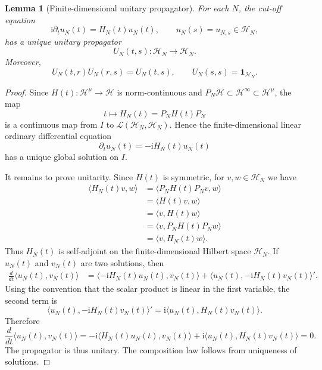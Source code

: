 \documentclass[11pt]{amsart}
\theoremstyle{plain}
\newtheorem{lemma}[theorem]{Lemma}
\theoremstyle{definition}
\theoremstyle{remark}
\newcommand{\Hilb}{\mathcal H}
\newcommand{\Id}{\mathbf 1}
\newcommand{\ii}{\mathrm i}
\begin{document}
\begin{lemma}[Finite-dimensional unitary propagator]
\label{lem:finite-propagator}
For each \(N\), the cut-off equation
\[
        \ii\partial_t u_N(t)=H_N(t)u_N(t),
        \qquad
        u_N(s)=u_{N,s}\in\Hilb_N,
\]
has a unique unitary propagator
\[
        U_N(t,s):\Hilb_N\to\Hilb_N.
\]
Moreover,
\[
        U_N(t,r)U_N(r,s)=U_N(t,s),
        \qquad
        U_N(s,s)=\Id_{\Hilb_N}.
\]
\end{lemma}

\begin{proof}
Since \(H(t):\Hilb^\mu\to\Hilb\) is norm-continuous and
\(P_N\Hilb\subset \Hilb^\infty\subset \Hilb^\mu\), the map
\[
        t\longmapsto H_N(t)=P_NH(t)P_N
\]
is a continuous map from \(I\) to
\(\mathcal L(\Hilb_N,\Hilb_N)\).  Hence the finite-dimensional linear
ordinary differential equation
\[
        \partial_t u_N(t)=-\ii H_N(t)u_N(t)
\]
has a unique global solution on \(I\).

It remains to prove unitarity.  Since \(H(t)\) is symmetric, for
\(v,w\in\Hilb_N\) we have
\[
\begin{aligned}
        \langle H_N(t)v,w\rangle
        &=
        \langle P_NH(t)P_Nv,w\rangle        \\
        &=
        \langle H(t)v,w\rangle              \\
        &=
        \langle v,H(t)w\rangle              \\
        &=
        \langle v,P_NH(t)P_Nw\rangle        \\
        &=
        \langle v,H_N(t)w\rangle.
\end{aligned}
\]
Thus \(H_N(t)\) is self-adjoint on the finite-dimensional Hilbert space
\(\Hilb_N\).  If \(u_N(t)\) and \(v_N(t)\) are two solutions, then
\[
\begin{aligned}
        \frac{d}{dt}\langle u_N(t),v_N(t)\rangle
        &=
        \langle -\ii H_N(t)u_N(t),v_N(t)\rangle
        +
        \langle u_N(t),-\ii H_N(t)v_N(t)\rangle' .
\end{aligned}
\]
Using the convention that the scalar product is linear in the first
variable, the second term is
\[
        \langle u_N(t),-\ii H_N(t)v_N(t)\rangle'
        =
        \ii\langle u_N(t),H_N(t)v_N(t)\rangle.
\]
Therefore
\[
        \frac{d}{dt}\langle u_N(t),v_N(t)\rangle
        =
        -\ii\langle H_N(t)u_N(t),v_N(t)\rangle
        +
        \ii\langle u_N(t),H_N(t)v_N(t)\rangle
        =
        0.
\]
The propagator is thus unitary.  The composition law follows from
uniqueness of solutions.
\end{proof}
\end{document}
